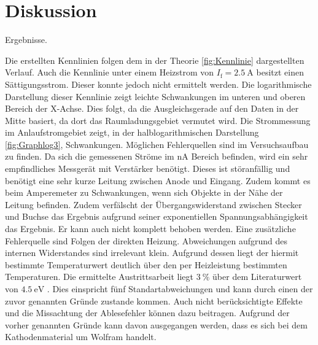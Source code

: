 
\section{Diskussion}
\label{sec:Diskussion}

 \begin{table}
 	\centering
 	\caption{Ergebnisse.}
 	
 \end{table}

Die erstellten Kennlinien folgen dem in der Theorie \ref{fig:Kennlinie} dargestellten Verlauf.
 Auch die Kennlinie unter einem Heizstrom von $I_\text{f} = \SI{2.5}{\ampere}$
 besitzt einen Sättigungsstrom. Dieser konnte jedoch nicht ermittelt werden.
Die logarithmische Darstellung dieser Kennlinie zeigt leichte Schwankungen im
unteren und oberen Bereich der X-Achse. Dies folgt, da die Ausgleichsgerade auf
den Daten in der Mitte basiert, da dort das Raumladungsgebiet vermutet wird.
Die Strommessung im Anlaufstromgebiet zeigt, in der halblogarithmischen
Darstellung \ref{fig:Graphlog3}, Schwankungen. Möglichen Fehlerquellen sind im
Versuchsaufbau zu finden. Da sich die gemessenen Ströme im $\si{\nano\ampere}$
Bereich befinden, wird ein sehr empfindliches Messgerät mit Verstärker benötigt.
Dieses ist störanfällig und benötigt eine sehr kurze Leitung zwischen Anode und Eingang.
Zudem kommt es beim Amperemeter zu Schwankungen, wenn sich Objekte in der Nähe der
Leitung befinden. Zudem verfälscht der Übergangswiderstand zwischen Stecker und
Buchse das Ergebnis aufgrund seiner exponentiellen Spannungsabhängigkeit das Ergebnis.
 Er kann auch nicht komplett behoben werden. Eine zusätzliche Fehlerquelle sind
 Folgen der direkten Heizung. Abweichungen aufgrund des internen Widerstandes
 sind irrelevant klein. Aufgrund dessen liegt der hiermit bestimmte Temperaturwert
 deutlich über den per Heizleistung bestimmten Temperaturen. Die ermittelte
 Austrittsarbeit liegt $\SI{3}{\percent}$ über dem Literaturwert von $\SI{4.5}{\electronvolt}$ \cite{wolfaus}. Dies einspricht fünf Standartabweichungen und kann durch einen der zuvor genannten Gründe zustande kommen. Auch nicht berücksichtigte Effekte und die Missachtung der Ablesefehler können dazu beitragen. Aufgrund der vorher genannten Gründe kann davon ausgegangen werden, dass es sich bei dem Kathodenmaterial um Wolfram handelt.
